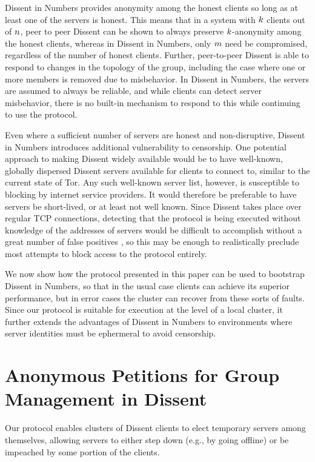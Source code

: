   Dissent in Numbers provides anonymity among the honest clients so long as at
  least one of the servers is honest. This means that in a system with
  $k$ clients out of $n$, peer to peer Dissent can be shown
  to always preserve $k$-anonymity among the honest clients, whereas
  in Dissent in Numbers, only $m$ need be compromised, regardless of
  the number of honest clients. Further, peer-to-peer Dissent is able to
  respond to changes in the topology of the group, including the case where
  one or more members is removed due to misbehavior. In Dissent in Numbers,
  the servers are assumed to always be reliable, and while clients can detect
  server misbehavior, there is no built-in mechanism to respond to this while
  continuing to use the protocol.

  Even where a sufficient number of servers are honest and non-disruptive,
  Dissent in Numbers introduces additional vulnerability to censorship.
  One potential approach to making Dissent widely available would be to have
  well-known, globally dispersed Dissent servers available for clients to
  connect to, similar to the current state of Tor. Any such well-known server
  list, however, is susceptible to blocking by internet service providers. It
  would therefore be preferable to have servers be short-lived, or at least
  not well known. Since Dissent takes place over regular TCP connections,
  detecting that the protocol is being executed without knowledge of the
  addresses of servers would be difficult to accomplish without a great number
  of false positives \cite{houmansadr_parrot_2013}, so this may be enough to
  realistically preclude most attempts to block access to the protocol
  entirely.

  We now show how the protocol presented in this paper can be used to
  bootstrap Dissent in Numbers, so that in the usual case clients can achieve
  its superior performance, but in error cases the cluster can recover from
  these sorts of faults. Since our protocol is suitable for execution at the
  level of a local cluster, it further extends the advantages of Dissent in
  Numbers to environments where server identities must be ephermeral to avoid
  censorship.

\section{Anonymous Petitions for Group Management in Dissent}
  Our protocol enables clusters of Dissent clients to elect temporary
  servers among themselves, allowing servers to either step down (e.g., by
  going offline) or be impeached by some portion of the clients.

